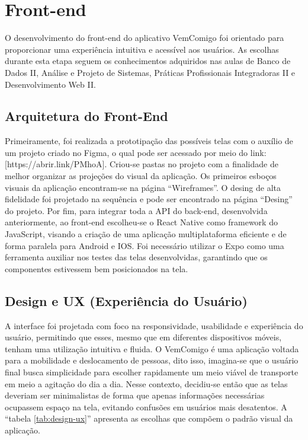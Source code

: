 \section{Front-end}

O desenvolvimento do front-end do aplicativo VemComigo foi orientado para proporcionar uma experiência intuitiva e acessível aos usuários. As escolhas durante esta etapa seguem os conhecimentos adquiridos nas aulas de Banco de Dados II, Análise e Projeto de Sistemas, Práticas Profissionais Integradoras II e Desenvolvimento Web II.

\subsection{Arquitetura do Front-End}

Primeiramente, foi realizada a prototipação das possíveis telas com o auxílio de um projeto criado no Figma, o qual pode ser acessado por meio do link:[https://abrir.link/PMhoA]. Criou-se pastas no projeto com a finalidade de melhor organizar as projeções do visual da aplicação. Os primeiros esboços visuais da aplicação encontram-se na página ``Wireframes''. O desing de alta fidelidade foi projetado na sequência e pode ser encontrado na página ``Desing'' do projeto. Por fim, para integrar toda a API do back-end, desenvolvida anteriormente, ao front-end escolheu-se o React Native como framework do JavaScript, visando a criação de uma aplicação multiplataforma eficiente e de forma paralela para Android e IOS. Foi necessário utilizar o Expo como uma ferramenta auxiliar nos testes das telas desenvolvidas, garantindo que os componentes estivessem bem posicionados na tela.

\subsection{Design e UX (Experiência do Usuário)}

A interface foi projetada com foco na responsividade, usabilidade e experiência do usuário, permitindo que esses, mesmo que em diferentes dispositivos móveis, tenham uma utilização intuitiva e fluida. O VemComigo é uma aplicação voltada para a mobilidade e deslocamento de pessoas, dito isso, imagina-se que o usuário final busca simplicidade para escolher rapidamente um meio viável de transporte em meio a agitação do dia a dia. Nesse contexto, decidiu-se então que as telas deveriam ser minimalistas de forma que apenas informações necessárias ocupassem espaço na tela, evitando confusões em usuários mais desatentos. A ``tabela \ref{tab:design-ux}'' apresenta as escolhas que compõem o padrão visual da aplicação.

